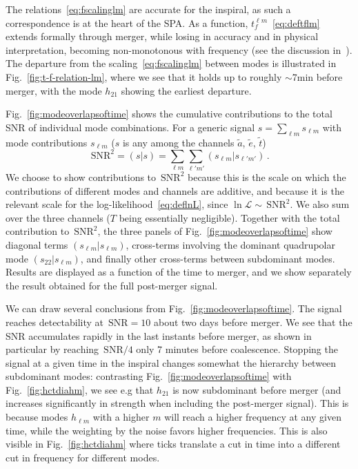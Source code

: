 \documentclass[aps,showpacs,twocolumn,prd,superscriptaddress,nofootinbib]{revtex4-1}
\newcommand{\be}{\begin{equation}}
\newcommand{\ee}{\end{equation}}
\newcommand\calL{{\mathcal{L}}}
\newcommand{\SNR}{\,\mathrm{SNR}}
\begin{document}
The relations~\eqref{eq:fscalinglm} are accurate for the inspiral, as such a correspondence is at the heart of the SPA. As a function, $t_{f}^{\ell m}$~\eqref{eq:deftflm} extends formally through merger, while losing in accuracy and in physical interpretation, becoming non-monotonous with frequency (see the discussion in~\cite{MB18}). The departure from the scaling~\eqref{eq:fscalinglm} between modes is illustrated in Fig.~\ref{fig:t-f-relation-lm}, where we see that it holds up to roughly $\sim$7min before merger, with the mode $h_{21}$ showing the earliest departure.

Fig.~\ref{fig:modeoverlapsoftime} shows the cumulative contributions to the total SNR of individual mode combinations. For a generic signal $s = \sum_{\ell m} s_{\ell m}$ with mode contributions $s_{\ell m}$ ($s$ is any among the channels $\tilde{a}$, $\tilde{e}$, $\tilde{t}$)
\be\label{eq:defcontribSNR2}
	\SNR^{2} = (s|s) = \sum_{\ell m} \sum_{\ell' m'} (s_{\ell m} | s_{\ell' m'}) \,.
\ee
We choose to show contributions to $\SNR^{2}$ because this is the scale on which the contributions of different modes and channels are additive, and because it is the relevant scale for the log-likelihood~\eqref{eq:deflnL}, since $\ln \calL \sim \SNR^{2}$. We also sum over the three channels ($T$ being essentially negligible). Together with the total contribution to $\SNR^{2}$, the three panels of Fig.~\ref{fig:modeoverlapsoftime} show diagonal terms $(s_{\ell m} | s_{\ell m})$, cross-terms involving the dominant quadrupolar mode $(s_{22} | s_{\ell m})$, and finally other cross-terms between subdominant modes. Results are displayed as a function of the time to merger, and we show separately the result obtained for the full post-merger signal.

We can draw several conclusions from Fig.~\ref{fig:modeoverlapsoftime}. The signal reaches detectability at $\SNR=10$ about two days before merger. We see that the SNR accumulates rapidly in the last instants before merger, as shown in particular by reaching $\SNR/4$ only 7 minutes before coalescence. Stopping the signal at a given time in the inspiral changes somewhat the hierarchy between subdominant modes: contrasting Fig.~\ref{fig:modeoverlapsoftime} with Fig.~\ref{fig:hctdiahm}, we see e.g that $h_{21}$ is now subdominant before merger (and increases significantly in strength when including the post-merger signal). This is because modes $h_{\ell m}$ with a higher $m$ will reach a higher frequency at any given time, while the weighting by the noise favors higher frequencies. This is also visible in Fig.~\ref{fig:hctdiahm} where ticks translate a cut in time into a different cut in frequency for different modes.
\end{document}
